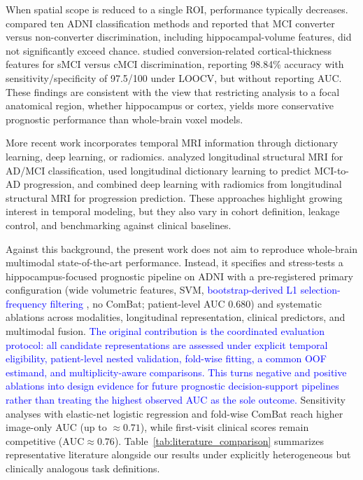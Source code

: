 \documentclass[review]{elsarticle}
\newcommand{\corrigir}[2]{%
	\textcolor{red}{\sout{#1}} %
	\textcolor{blue}{#2}%
}
\begin{document}
	When spatial scope is reduced to a single ROI, performance typically decreases. \citet{cuingnet-2011} compared ten ADNI classification methods and reported that MCI converter versus non-converter discrimination, including hippocampal-volume features, did not significantly exceed chance. \citet{guo-2017a} studied conversion-related cortical-thickness features for sMCI versus cMCI discrimination, reporting 98.84\% accuracy with sensitivity/specificity of 97.5/100 under LOOCV, but without reporting AUC. These findings are consistent with the view that restricting analysis to a focal anatomical region, whether hippocampus or cortex, yields more conservative prognostic performance than whole-brain voxel models.
	
	More recent work incorporates temporal MRI information through dictionary learning, deep learning, or radiomics. \citet{zhang-2019} analyzed longitudinal structural MRI for AD/MCI classification, \citet{lin-2020} used longitudinal dictionary learning to predict MCI-to-AD progression, and \citet{aghajanian-2025} combined deep learning with radiomics from longitudinal structural MRI for progression prediction. These approaches highlight growing interest in temporal modeling, but they also vary in cohort definition, leakage control, and benchmarking against clinical baselines.
	
	Against this background, the present work does not aim to reproduce whole-brain multimodal state-of-the-art performance. Instead, it specifies and stress-tests a hippocampus-focused prognostic pipeline on ADNI with a pre-registered primary configuration (wide volumetric features, SVM, \corrigir{}{bootstrap-derived L1 selection-frequency filtering}, no ComBat; patient-level AUC 0.680) and systematic ablations across modalities, longitudinal representation, clinical predictors, and multimodal fusion. \corrigir{}{The original contribution is the coordinated evaluation protocol: all candidate representations are assessed under explicit temporal eligibility, patient-level nested validation, fold-wise fitting, a common OOF estimand, and multiplicity-aware comparisons. This turns negative and positive ablations into design evidence for future prognostic decision-support pipelines rather than treating the highest observed AUC as the sole outcome.} Sensitivity analyses with elastic-net logistic regression and fold-wise ComBat reach higher image-only AUC (up to $\approx0.71$), while first-visit clinical scores remain competitive ($\mathrm{AUC}\approx0.76$). Table~\ref{tab:literature_comparison} summarizes representative literature alongside our results under explicitly heterogeneous but clinically analogous task definitions.
	
\end{document}
